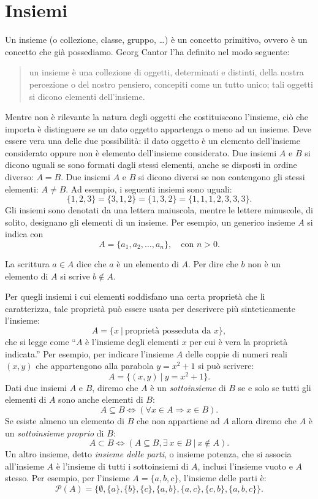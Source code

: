 \documentclass[
]{memoir}
\theoremstyle{definition}
\theoremstyle{definition}
\theoremstyle{definition}
\theoremstyle{definition}
\theoremstyle{remark}
\begin{document}
\hypertarget{insiemistica}{%
\chapter{Insiemi}\label{insiemistica}}

Un insieme (o collezione, classe, gruppo, \ldots) è un concetto primitivo,
ovvero è un concetto che già possediamo. Georg Cantor l'ha definito nel
modo seguente:

\begin{quote}
un insieme è una collezione di oggetti, determinati e distinti, della nostra percezione o del nostro pensiero, concepiti come un tutto unico; tali oggetti si dicono elementi dell'insieme.
\end{quote}

Mentre non è rilevante la natura degli oggetti che costituiscono
l'insieme, ciò che importa è distinguere se un dato oggetto appartenga o
meno ad un insieme. Deve essere vera una delle due possibilità: il dato
oggetto è un elemento dell'insieme considerato oppure non è elemento
dell'insieme considerato. Due insiemi \(A\) e \(B\) si dicono uguali se sono
formati dagli stessi elementi, anche se disposti in ordine diverso:
\(A=B\). Due insiemi \(A\) e \(B\) si dicono diversi se non contengono gli
stessi elementi: \(A \neq B\). Ad esempio, i seguenti insiemi sono uguali:
\[\{1, 2, 3\} = \{3, 1, 2\} = \{1, 3, 2\}= \{1, 1, 1, 2, 3, 3, 3\}.\]
Gli insiemi sono denotati da una lettera maiuscola, mentre le lettere
minuscole, di solito, designano gli elementi di un insieme. Per esempio,
un generico insieme \(A\) si indica con
\[A = \{a_1, a_2, \dots, a_n\}, \quad \text{con~} n > 0.\]

La scrittura \(a \in A\) dice che \(a\) è un elemento di \(A\). Per dire che
\(b\) non è un elemento di \(A\) si scrive \(b \notin A.\)

Per quegli insiemi i cui elementi soddisfano una certa proprietà che li
caratterizza, tale proprietà può essere usata per descrivere più
sinteticamente l'insieme:
\[
A = \{x ~\vert~ \text{proprietà posseduta da~} x\},
\]
che si legge come ``\(A\) è l'insieme degli elementi \(x\) per cui è vera la proprietà
indicata.'' Per esempio, per indicare l'insieme \(A\) delle coppie di
numeri reali \((x,y)\) che appartengono alla parabola \(y = x^2 + 1\) si può
scrivere:
\[
A = \{(x,y) ~\vert~ y = x^2 + 1\}.
\]
Dati due insiemi \(A\) e \(B\), diremo che \(A\) è un \emph{sottoinsieme} di \(B\) se
e solo se tutti gli elementi di \(A\) sono anche elementi di \(B\):
\[A \subseteq B \iff (\forall x \in A \Rightarrow x \in B).\] Se esiste
almeno un elemento di \(B\) che non appartiene ad \(A\) allora diremo che
\(A\) è un \emph{sottoinsieme proprio} di \(B\):
\[
A \subset B \iff (A \subseteq B, \exists~ x \in B ~\vert~ x \notin A).
\]
Un altro insieme, detto \emph{insieme delle parti}, o insieme potenza, che si
associa all'insieme \(A\) è l'insieme di tutti i sottoinsiemi di \(A\),
inclusi l'insieme vuoto e \(A\) stesso. Per esempio, per l'insieme
\(A = \{a, b, c\}\), l'insieme delle parti è:
\[
\mathcal{P}(A) = \{
\emptyset, \{a\}, \{b\}, \{c\},
 \{a, b\}, \{a, c\}, \{c, b\},
 \{a, b, c\}
\}.
\]
\end{document}
